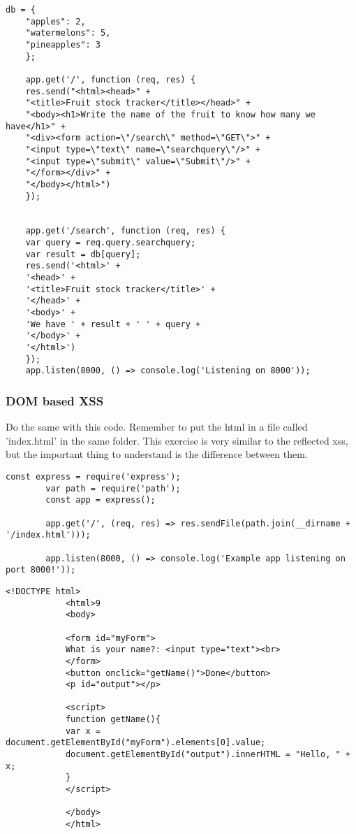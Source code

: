 \begin{Exercise}[label={websec-xss-types}]
\begin{lstlisting}[style=JavaScript]
	db = {
	"apples": 2,
	"watermelons": 5,
	"pineapples": 3
	};
	
	app.get('/', function (req, res) {
	res.send("<html><head>" +
	"<title>Fruit stock tracker</title></head>" +
	"<body><h1>Write the name of the fruit to know how many we have</h1>" +
	"<div><form action=\"/search\" method=\"GET\">" +
	"<input type=\"text\" name=\"searchquery\"/>" +
	"<input type=\"submit\" value=\"Submit\"/>" +
	"</form></div>" +
	"</body></html>")
	});
	
	
	app.get('/search', function (req, res) {
	var query = req.query.searchquery;
	var result = db[query];
	res.send('<html>' +
	'<head>' +
	'<title>Fruit stock tracker</title>' +
	'</head>' +
	'<body>' +
	'We have ' + result + ' ' + query +
	'</body>' +
	'</html>')
	});
	app.listen(8000, () => console.log('Listening on 8000'));
	\end{lstlisting}
	

	\subsubsection{DOM based XSS}
		Do the same with this code. Remember to put the html in a file called 'index.html' in the same folder. This exercise is very similar to the reflected xss, but the important thing to understand is the difference between them.
		\begin{lstlisting}[style=JavaScript]
		const express = require('express');
		var path = require('path');
		const app = express();
		
		app.get('/', (req, res) => res.sendFile(path.join(__dirname + '/index.html')));
		
		app.listen(8000, () => console.log('Example app listening on port 8000!'));
		\end{lstlisting}
		\begin{lstlisting}[style=JavaScript]
			<!DOCTYPE html>
			<html>9
			<body>
			
			<form id="myForm">
			What is your name?: <input type="text"><br>
			</form>
			<button onclick="getName()">Done</button>
			<p id="output"></p>
			
			<script>
			function getName(){
			var x = document.getElementById("myForm").elements[0].value;
			document.getElementById("output").innerHTML = "Hello, " + x;
			}
			</script>
			
			</body>
			</html>
		\end{lstlisting}
\end{Exercise}
